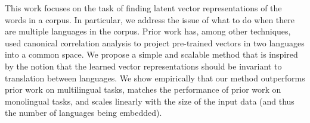This work focuses on the task of finding latent vector representations of the words in a corpus. In particular, we address the issue of what to do when there are multiple languages in the corpus. Prior work has, among other techniques, used canonical correlation analysis to project pre-trained vectors in two languages into a common space. We propose a simple and scalable method that is inspired by the notion that the learned vector representations should be invariant to translation between languages. We show empirically that our method outperforms prior work on multilingual tasks, matches the performance of prior work on monolingual tasks, and scales linearly with the size of the input data (and thus the number of languages being embedded).
